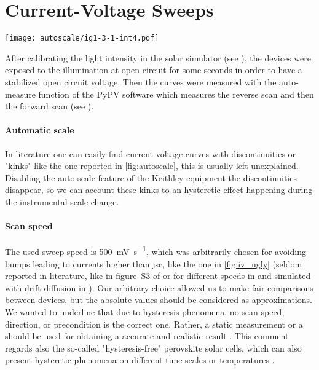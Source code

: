 \section{Current-Voltage Sweeps}

	\begin{SCfigure}%
	\centering
	\texttt{[image: autoscale/ig1-3-1-int4.pdf]}
	\label{fig:autoscale}
\end{SCfigure}

	After calibrating the light intensity in the solar simulator (see ), the devices were exposed to the illumination at open circuit for some seconds in order to have a stabilized open circuit voltage.
	Then the curves were measured with the auto-measure function of the PyPV software which measures the reverse scan and then the forward scan (see ).

	\paragraph{Automatic scale}\label{autoscale}
	In literature one can easily find current\hyp{}voltage curves with discontinuities or "kinks" \cite{Li2016,Snaith2014,Zhang2015} like the one reported in \cref{fig:autoscale}, this is usually left unexplained.
	Disabling the auto-scale feature of the Keithley equipment the discontinuities disappear, so we can account these kinks to an hysteretic effect happening during the instrumental scale change.



	\paragraph{Scan speed}\label{characterization_scanspeed}
	The used sweep speed is \SI{500}{\mV\per\s}, which was arbitrarily chosen for avoiding bumps leading to currents higher than \gls{jsc}, like the one in \cref{fig:iv_ugly} (seldom reported in literature, like in figure~S3 of \cite{Du2018} or for different speeds in \cite{CorreaBaena2015,Tress2015,Unger2014,Richardson2016} and simulated with drift-diffusion in \cite{Walter2018}).
	Our arbitrary choice allowed us to make fair comparisons between devices, but the absolute values should be considered as approximations.
	We wanted to underline that due to hysteresis phenomena, no scan speed, direction, or precondition is the correct one.
	Rather, a static measurement or a  should be used for obtaining a accurate and realistic result \cite{Zimmermann2016}.
	This comment regards also the so-called "hysteresis-free" perovskite solar cells, which can also present hysteretic phenomena on different time\hyp{}scales \cite{Jacobs2018,Du2018} or temperatures \cite{Bryant2015}.
	
